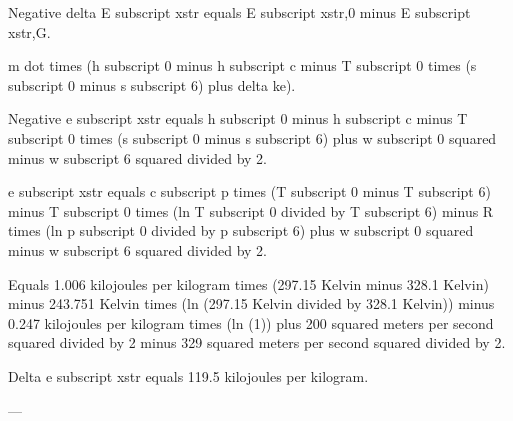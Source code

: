 Negative delta E subscript xstr equals E subscript xstr,0 minus E subscript xstr,G.  

m dot times (h subscript 0 minus h subscript c minus T subscript 0 times (s subscript 0 minus s subscript 6) plus delta ke).  

Negative e subscript xstr equals h subscript 0 minus h subscript c minus T subscript 0 times (s subscript 0 minus s subscript 6) plus w subscript 0 squared minus w subscript 6 squared divided by 2.  

e subscript xstr equals c subscript p times (T subscript 0 minus T subscript 6) minus T subscript 0 times (ln T subscript 0 divided by T subscript 6) minus R times (ln p subscript 0 divided by p subscript 6) plus w subscript 0 squared minus w subscript 6 squared divided by 2.  

Equals 1.006 kilojoules per kilogram times (297.15 Kelvin minus 328.1 Kelvin) minus 243.751 Kelvin times (ln (297.15 Kelvin divided by 328.1 Kelvin)) minus 0.247 kilojoules per kilogram times (ln (1)) plus 200 squared meters per second squared divided by 2 minus 329 squared meters per second squared divided by 2.  

Delta e subscript xstr equals 119.5 kilojoules per kilogram.  

---